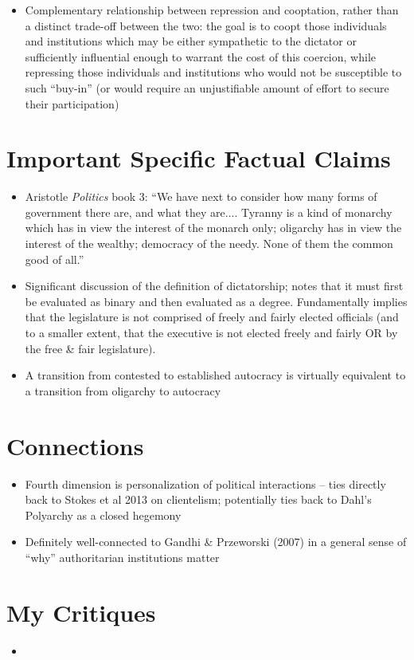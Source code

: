 \documentclass[12pt]{article}
\begin{document}
\begin{itemize}[leftmargin=*, itemsep=4pt]
    \item Complementary relationship between repression and cooptation, rather than a distinct trade-off between the two: the goal is to coopt those individuals and institutions which may be either sympathetic to the dictator or sufficiently influential enough to warrant the cost of this coercion, while repressing those individuals and institutions who would not be susceptible to such ``buy-in'' (or would require an unjustifiable amount of effort to secure their participation)
\end{itemize}


\section{Important Specific Factual Claims}

\begin{itemize}[leftmargin=*, itemsep=4pt]
    \item Aristotle \emph{Politics} book 3: ``We have next to consider how many forms of government there are, and what they are.... Tyranny is a kind of monarchy which has in view the interest of the monarch only; oligarchy has in view the interest of the wealthy; democracy of the needy. None of them the common good of all.''
    \item Significant discussion of the definition of dictatorship; notes that it must first be evaluated as binary and then evaluated as a degree. Fundamentally implies that the legislature is not comprised of freely and fairly elected officials (and to a smaller extent, that the executive is not elected freely and fairly OR by the free \& fair legislature).
    \item A transition from contested to established autocracy is virtually equivalent to a transition from oligarchy to autocracy
\end{itemize}

\section*{Connections}

\begin{itemize}
    \item Fourth dimension is personalization of political interactions -- ties directly back to Stokes et al 2013 on clientelism; potentially ties back to Dahl's Polyarchy as a closed hegemony
    \item Definitely well-connected to Gandhi \& Przeworski (2007) in a general sense of ``why'' authoritarian institutions matter
\end{itemize}

\section{My Critiques}

\begin{itemize}
    \item
\end{itemize}
\end{document}
